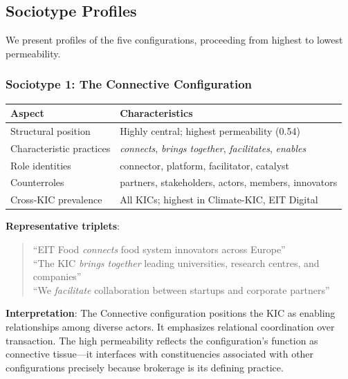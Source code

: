 \documentclass[../main.tex]{subfiles}
\begin{document}
\subsection{Sociotype Profiles}

We present profiles of the five configurations, proceeding from highest to lowest permeability.

\subsubsection{Sociotype 1: The Connective Configuration}

\begin{center}
\small
\begin{tabular}{ll}
\toprule
\textbf{Aspect} & \textbf{Characteristics} \\
\midrule
Structural position & Highly central; highest permeability (0.54) \\
Characteristic practices & \textit{connects}, \textit{brings together}, \textit{facilitates}, \textit{enables} \\
Role identities & connector, platform, facilitator, catalyst \\
Counterroles & partners, stakeholders, actors, members, innovators \\
Cross-KIC prevalence & All KICs; highest in Climate-KIC, EIT Digital \\
\bottomrule
\end{tabular}
\end{center}

\textbf{Representative triplets}:
\begin{quote}
\small
``EIT Food \textit{connects} food system innovators across Europe''\\
``The KIC \textit{brings together} leading universities, research centres, and companies''\\
``We \textit{facilitate} collaboration between startups and corporate partners''
\end{quote}

\textbf{Interpretation}: The Connective configuration positions the KIC as enabling relationships among diverse actors. It emphasizes relational coordination over transaction. The high permeability reflects the configuration's function as connective tissue---it interfaces with constituencies associated with other configurations precisely because brokerage is its defining practice.
\end{document}
